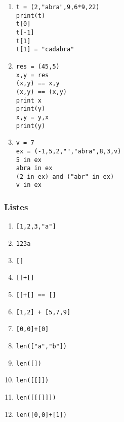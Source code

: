 \begin{multicols}{2}
\begin{enumerate}[label=\emph{\alph*)}]
\item 
\begin{lstlisting}
t = (2,"abra",9,6*9,22)
print(t)
t[0]
t[-1]
t[1]
t[1] = "cadabra" 
\end{lstlisting}
\end{enumerate}
\begin{enumerate}[label=\emph{\alph*)}]
\setcounter{enumi}{1}
\item 
\begin{lstlisting}
res = (45,5)
x,y = res
(x,y) == x,y
(x,y) == (x,y)
print x
print(y)
x,y = y,x
print(y)
\end{lstlisting}
\end{enumerate}
\begin{enumerate}[label=\emph{\alph*)}]
\setcounter{enumi}{2}
\item 
\begin{lstlisting}
v = 7
ex = (-1,5,2,"","abra",8,3,v)
5 in ex
abra in ex
(2 in ex) and ("abr" in ex)
v in ex
\end{lstlisting}
\end{enumerate}



\subsubsection*{Listes}


\begin{multicols}{2}
  \begin{enumerate}[label=\emph{\alph*)}]
    \item \texttt{[1,2,3,"a"]}
    \item \texttt{123a}
    \item \texttt{[]}
    \item \texttt{[]+[]}
    \item \texttt{[]+[] == []}
    \item \texttt{[1,2] + [5,7,9]}
    \item \texttt{[0,0]+[0]}
    \item \texttt{len(["a","b"])}
    \item \texttt{len([])}
    \item \texttt{len([[]])}
    \item \texttt{len([[[]]])}
    \item \texttt{len([0,0]+[1])}
  \end{enumerate}
\end{multicols}


\end{multicols}
